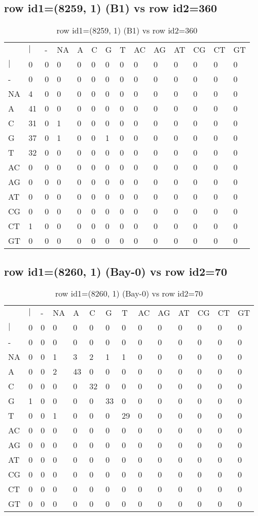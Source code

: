 \subsection{row id1=(8259, 1) (B1) vs row id2=360}
\begin{center}
\begin{longtable}{|l|l|l|l|l|l|l|l|l|l|l|l|l|l|}
\caption{row id1=(8259, 1) (B1) vs row id2=360} \label{table_dm400}\\
\hline
\\
\hline
&$|$&-&NA&A&C&G&T&AC&AG&AT&CG&CT&GT\\
$|$&0&0&0&0&0&0&0&0&0&0&0&0&0\\
-&0&0&0&0&0&0&0&0&0&0&0&0&0\\
NA&4&0&0&0&0&0&0&0&0&0&0&0&0\\
A&41&0&0&0&0&0&0&0&0&0&0&0&0\\
C&31&0&1&0&0&0&0&0&0&0&0&0&0\\
G&37&0&1&0&0&1&0&0&0&0&0&0&0\\
T&32&0&0&0&0&0&0&0&0&0&0&0&0\\
AC&0&0&0&0&0&0&0&0&0&0&0&0&0\\
AG&0&0&0&0&0&0&0&0&0&0&0&0&0\\
AT&0&0&0&0&0&0&0&0&0&0&0&0&0\\
CG&0&0&0&0&0&0&0&0&0&0&0&0&0\\
CT&1&0&0&0&0&0&0&0&0&0&0&0&0\\
GT&0&0&0&0&0&0&0&0&0&0&0&0&0\\
\hline
\end{longtable}
\end{center}

\subsection{row id1=(8260, 1) (Bay-0) vs row id2=70}
\begin{center}
\begin{longtable}{|l|l|l|l|l|l|l|l|l|l|l|l|l|l|}
\caption{row id1=(8260, 1) (Bay-0) vs row id2=70} \label{table_dm402}\\
\hline
\\
\hline
&$|$&-&NA&A&C&G&T&AC&AG&AT&CG&CT&GT\\
$|$&0&0&0&0&0&0&0&0&0&0&0&0&0\\
-&0&0&0&0&0&0&0&0&0&0&0&0&0\\
NA&0&0&1&3&2&1&1&0&0&0&0&0&0\\
A&0&0&2&43&0&0&0&0&0&0&0&0&0\\
C&0&0&0&0&32&0&0&0&0&0&0&0&0\\
G&1&0&0&0&0&33&0&0&0&0&0&0&0\\
T&0&0&1&0&0&0&29&0&0&0&0&0&0\\
AC&0&0&0&0&0&0&0&0&0&0&0&0&0\\
AG&0&0&0&0&0&0&0&0&0&0&0&0&0\\
AT&0&0&0&0&0&0&0&0&0&0&0&0&0\\
CG&0&0&0&0&0&0&0&0&0&0&0&0&0\\
CT&0&0&0&0&0&0&0&0&0&0&0&0&0\\
GT&0&0&0&0&0&0&0&0&0&0&0&0&0\\
\hline
\end{longtable}
\end{center}

